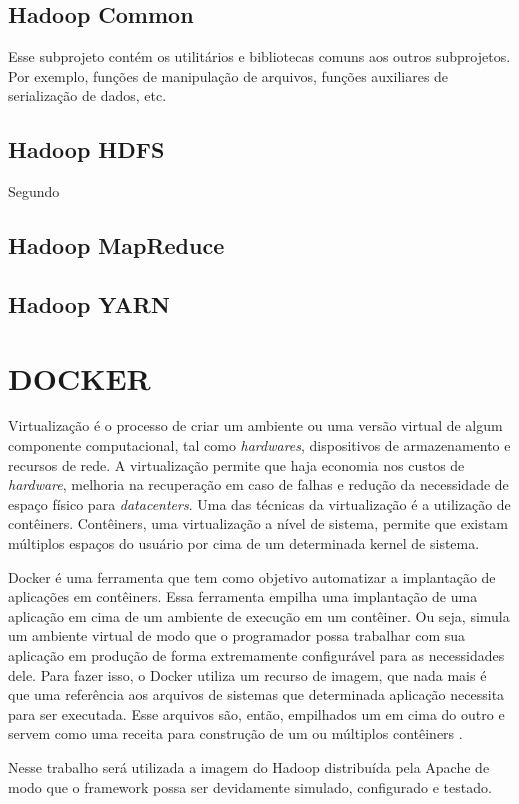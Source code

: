 \subsection{Hadoop Common}\label{ssec:hadoopcommon}

Esse subprojeto contém os utilitários e bibliotecas comuns aos outros subprojetos. Por exemplo, funções de manipulação de arquivos, funções auxiliares de serialização de dados, etc.

\subsection{Hadoop HDFS}\label{ssec:hadoophdfs}
Segundo \textcite{HDFSDesign20}

\subsection{Hadoop MapReduce} \label{ssec:hadoopmapreduce}

\subsection{Hadoop YARN} \label{ssec:hadoopmapreduce}

\section{DOCKER} \label{sec:docker}

Virtualização é o processo de criar um ambiente ou uma versão virtual de algum componente computacional, tal como \textit{hardwares}, dispositivos de armazenamento e recursos de rede. A virtualização permite que haja economia nos custos de \textit{hardware}, melhoria na recuperação em caso de falhas e redução da necessidade de espaço físico para \textit{datacenters}. Uma das técnicas da virtualização é a utilização de contêiners. Contêiners, uma virtualização a nível de sistema, permite que existam múltiplos espaços do usuário por cima de um determinada kernel de sistema. 

Docker é uma ferramenta que tem como objetivo automatizar a implantação de aplicações em contêiners. Essa ferramenta empilha uma implantação de uma aplicação em cima de um ambiente de execução em um contêiner. Ou seja, simula um ambiente virtual de modo que o programador possa trabalhar com sua aplicação em produção de forma extremamente configurável para as necessidades dele. Para fazer isso, o Docker utiliza um recurso de imagem, que nada mais é que uma referência aos arquivos de sistemas que determinada aplicação necessita para ser executada. Esse arquivos são, então, empilhados um em cima do outro e servem como uma receita para construção de um ou múltiplos contêiners \cite{DockerBook14}.

Nesse trabalho será utilizada a imagem do Hadoop distribuída pela Apache de modo que o framework possa ser devidamente simulado, configurado e testado.